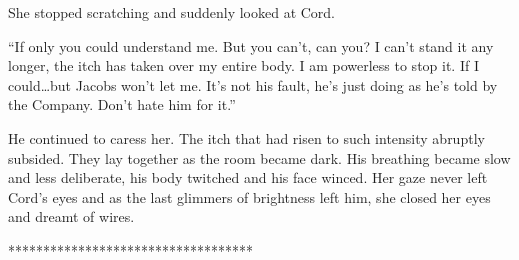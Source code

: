 She stopped scratching and suddenly looked at Cord.

``If only you could understand me. But you can't, can you? I can't stand
it any longer, the itch has taken over my entire body. I am powerless to
stop it. If I could\ldots but Jacobs won't let me. It's not his fault,
he's just doing as he's told by the Company. Don't hate him for it.''

He continued to caress her. The itch that had risen to such intensity
abruptly subsided. They lay together as the room became dark. His
breathing became slow and less deliberate, his body twitched and his
face winced. Her gaze never left Cord's eyes and as the last glimmers of
brightness left him, she closed her eyes and dreamt of wires.

***********************************
